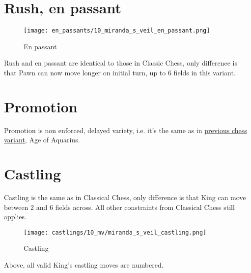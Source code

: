 \section*{Rush, en passant}
\label{sec:Miranda's veil/Rush, en passant}

\noindent
\begin{wrapfigure}[5]{l}{0.4\textwidth}
\centering
\texttt{[image: en\_passants/10\_miranda\_s\_veil\_en\_passant.png]}
\caption{En passant}
\label{fig:10_miranda_s_veil_en_passant}
\end{wrapfigure}
Rush and en passant are identical to those in Classic Chess, only difference
is that Pawn can now move longer on initial turn, up to 6 fields in this
variant.


\vspace*{9.0\baselineskip}
\section*{Promotion}
\label{sec:Miranda's veil/Promotion}

Promotion is non enforced, delayed variety, i.e. it's the same as in
\hyperref[sec:Age of Aquarius/Promotion]{previous chess variant}, Age of Aquarius.

\clearpage %

\section*{Castling}
\label{sec:Miranda's veil/Castling}

Castling is the same as in Classical Chess, only difference is that King can move between 2 and 6 fields across.
All other constraints from Classical Chess still applies.

\vspace*{-0.7\baselineskip}
\noindent
\begin{figure}[!h]
\texttt{[image: castlings/10\_mv/miranda\_s\_veil\_castling.png]}
\caption{Castling}
\label{fig:miranda_s_veil_castling}
\end{figure}

Above, all valid King's castling moves are numbered.

